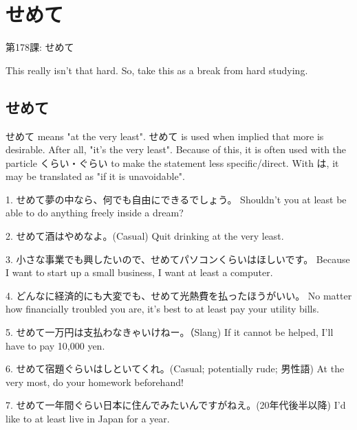     
\chapter{せめて}

\begin{center}
\begin{Large}
第178課: せめて 
\end{Large}
\end{center}
 
\par{ This really isn't that hard. So, take this as a break from hard studying. }
      
\section{せめて}
 
\par{ せめて means "at the very least". せめて is used when implied that more is desirable. After all, "it's the very least". Because of this, it is often used with the particle くらい・ぐらい to make the statement less specific\slash direct. With は, it may be translated as "if it is unavoidable". }

\par{1. せめて夢の中なら、何でも自由にできるでしょう。 \hfill\break
Shouldn't you at least be able to do anything freely inside a dream? }

\par{2. せめて酒はやめなよ。(Casual) \hfill\break
Quit drinking at the very least. }

\par{3. 小さな事業でも興したいので、せめてパソコンくらいはほしいです。 \hfill\break
Because I want to start up a small business, I want at least a computer. }

\par{4. どんなに経済的にも大変でも、せめて光熱費を払ったほうがいい。 \hfill\break
No matter how financially troubled you are, it's best to at least pay your utility bills. }

\par{5. せめて一万円は支払わなきゃいけねー。（Slang) \hfill\break
If it cannot be helped, I'll have to pay 10,000 yen. }

\par{6. せめて宿題ぐらいはしといてくれ。(Casual; potentially rude; 男性語) \hfill\break
At the very most, do your homework beforehand! }

\par{7. せめて一年間ぐらい日本に住んでみたいんですがねえ。(20年代後半以降) \hfill\break
I'd like to at least live in Japan for a year. }

